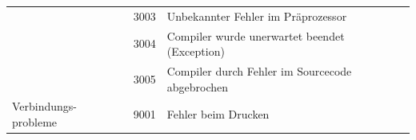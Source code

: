 \begin{minipage}{14cm}
\begin{tabular}{l|l|l}
	&3003&Unbekannter Fehler im Präprozessor\\
	&3004&Compiler wurde unerwartet beendet (Exception)\\
	&3005&Compiler durch Fehler im Sourcecode abgebrochen\\
	\hline
	\parbox{23mm}{Verbindungs- probleme}&9001&Fehler beim Drucken
\end{tabular}
\end{minipage}


